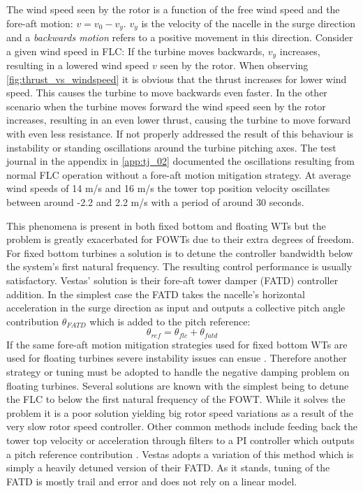 The wind speed seen by the rotor is a function of the free wind speed and the fore-aft motion: $ v = v_0 - v_y $. $ v_y $ is the velocity of the nacelle in the surge direction and a \textit{backwards motion} refers to a positive movement in this direction. Consider a given wind speed in FLC: If the turbine moves backwards, $ v_y $ increases, resulting in a lowered wind speed $ v $ seen by the rotor. When observing \cref{fig:thrust_vs_windspeed} it is obvious that the thrust increases for lower wind speed. This causes the turbine to move backwards even faster. In the other scenario when the turbine moves forward the wind speed seen by the rotor increases, resulting in an even lower thrust, causing the turbine to move forward with even less resistance. If not properly addressed the result of this behaviour is instability or standing oscillations around the turbine pitching axes. The test journal in the appendix in \cref{app:tj_02} documented the oscillations resulting from normal FLC operation without a fore-aft motion mitigation strategy. At average wind speeds of 14 m/s and 16 m/s the tower top position velocity oscillates between around -2.2 and 2.2 m/s with a period of around 30 seconds.

This phenomena is present in both fixed bottom and floating WTs but the problem is greatly exacerbated for FOWTs due to their extra degrees of freedom. For fixed bottom turbines a solution is to detune the controller bandwidth below the system's first natural frequency. The resulting control performance is usually satisfactory. Vestas' solution is their fore-aft tower damper (FATD) controller addition. In the simplest case the FATD takes the nacelle's horizontal acceleration in the surge direction as input and outputs a collective pitch angle contribution $ \theta_{FATD} $ which is added to the pitch reference:
\begin{equation}\label{eq:fatd}
	\theta_{ref} = \theta_{flc} + \theta_{fatd}
\end{equation}
If the same fore-aft motion mitigation strategies used for fixed bottom WTs are used for floating turbines severe instability issues can ensue \cite{Larsen2007}. Therefore another strategy or tuning must be adopted to handle the negative damping problem on floating turbines. Several solutions are known with the simplest being to detune the FLC to below the first natural frequency of the FOWT. While it solves the problem it is a poor solution yielding big rotor speed variations as a result of the very slow rotor speed controller. Other common methods include feeding back the tower top velocity or acceleration through filters to a PI controller which outputs a pitch reference contribution \cite{Grant2022}. Vestas adopts a variation of this method which is simply a heavily detuned version of their FATD. As it stands, tuning of the FATD is mostly trail and error and does not rely on a linear model. 

